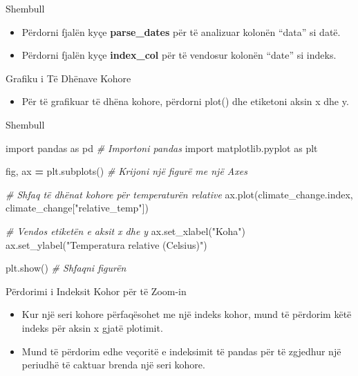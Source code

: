 \documentclass[
  ignorenonframetext,
]{beamer}
\newenvironment{Shaded}{\begin{snugshade}}{\end{snugshade}}
\newcommand{\CommentTok}[1]{\textcolor[rgb]{0.56,0.35,0.01}{\textit{#1}}}
\newcommand{\ImportTok}[1]{#1}
\newcommand{\NormalTok}[1]{#1}
\newcommand{\OperatorTok}[1]{\textcolor[rgb]{0.81,0.36,0.00}{\textbf{#1}}}
\newcommand{\StringTok}[1]{\textcolor[rgb]{0.31,0.60,0.02}{#1}}
\providecommand{\tightlist}{%
  \setlength{\itemsep}{0pt}\setlength{\parskip}{0pt}}
\begin{document}
\begin{frame}{Shembull}
\protect\hypertarget{shembull-1}{}
\begin{itemize}
\item
  Përdorni fjalën kyçe \textbf{parse\_dates} për të analizuar kolonën
  ``data'' si datë.
\item
  Përdorni fjalën kyçe \textbf{index\_col} për të vendosur kolonën
  ``date'' si indeks.
\end{itemize}
\end{frame}

\begin{frame}{Grafiku i Të Dhënave Kohore}
\protect\hypertarget{grafiku-i-tuxeb-dhuxebnave-kohore}{}
\begin{itemize}
\tightlist
\item
  Për të grafikuar të dhëna kohore, përdorni plot() dhe etiketoni aksin
  x dhe y.
\end{itemize}
\end{frame}

\begin{frame}[fragile]{Shembull}
\protect\hypertarget{shembull-2}{}

\begin{Shaded}
\begin{Highlighting}[]
\ImportTok{import}\NormalTok{ pandas }\ImportTok{as}\NormalTok{ pd  }\CommentTok{\# Importoni pandas}
\ImportTok{import}\NormalTok{ matplotlib.pyplot }\ImportTok{as}\NormalTok{ plt}

\NormalTok{fig, ax }\OperatorTok{=}\NormalTok{ plt.subplots()  }\CommentTok{\# Krijoni një figurë me një Axes}

\CommentTok{\# Shfaq të dhënat kohore për temperaturën relative}
\NormalTok{ax.plot(climate\_change.index, climate\_change[}\StringTok{"relative\_temp"}\NormalTok{])}

\CommentTok{\# Vendos etiketën e aksit x dhe y}
\NormalTok{ax.set\_xlabel(}\StringTok{"Koha"}\NormalTok{)}
\NormalTok{ax.set\_ylabel(}\StringTok{"Temperatura relative (Celsius)"}\NormalTok{)}

\NormalTok{plt.show()  }\CommentTok{\# Shfaqni figurën}
\end{Highlighting}
\end{Shaded}
\end{frame}

\begin{frame}{Përdorimi i Indeksit Kohor për të Zoom-in}
\protect\hypertarget{puxebrdorimi-i-indeksit-kohor-puxebr-tuxeb-zoom-in}{}
\begin{itemize}
\item
  Kur një seri kohore përfaqësohet me një indeks kohor, mund të përdorim
  këtë indeks për aksin x gjatë plotimit.
\item
  Mund të përdorim edhe veçoritë e indeksimit të pandas për të zgjedhur
  një periudhë të caktuar brenda një seri kohore.
\end{itemize}
\end{frame}
\end{document}
